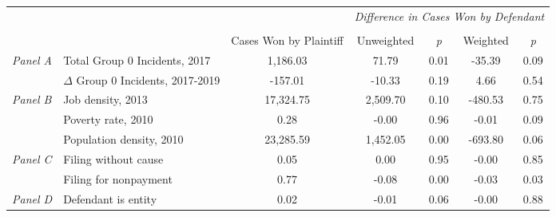 \begin{tabular}{llccccc}
\toprule
 &  & \textit{} & \multicolumn{4}{c}{\textit{Difference in Cases Won by Defendant}} \\
\cline{4-7}
\\
 &  & Cases Won by Plaintiff & Unweighted & \emph{p} & Weighted & \emph{p} \\
\midrule
\multirow[c]{2}{3cm}{\textit{Panel A}} & Total Group 0 Incidents, 2017 & 1,186.03 & 71.79 & 0.01 & -35.39 & 0.09 \\
 & $\Delta$ Group 0 Incidents, 2017-2019 & -157.01 & -10.33 & 0.19 & 4.66 & 0.54 \\
\cline{1-7}
\multirow[c]{3}{3cm}{\textit{Panel B}} & Job density, 2013 & 17,324.75 & 2,509.70 & 0.10 & -480.53 & 0.75 \\
 & Poverty rate, 2010 & 0.28 & -0.00 & 0.96 & -0.01 & 0.09 \\
 & Population density, 2010 & 23,285.59 & 1,452.05 & 0.00 & -693.80 & 0.06 \\
\cline{1-7}
\multirow[c]{2}{3cm}{\textit{Panel C}} & Filing without cause & 0.05 & 0.00 & 0.95 & -0.00 & 0.85 \\
 & Filing for nonpayment & 0.77 & -0.08 & 0.00 & -0.03 & 0.03 \\
\cline{1-7}
\textit{Panel D} & Defendant is entity & 0.02 & -0.01 & 0.06 & -0.00 & 0.88 \\
\cline{1-7}
\bottomrule
\end{tabular}
